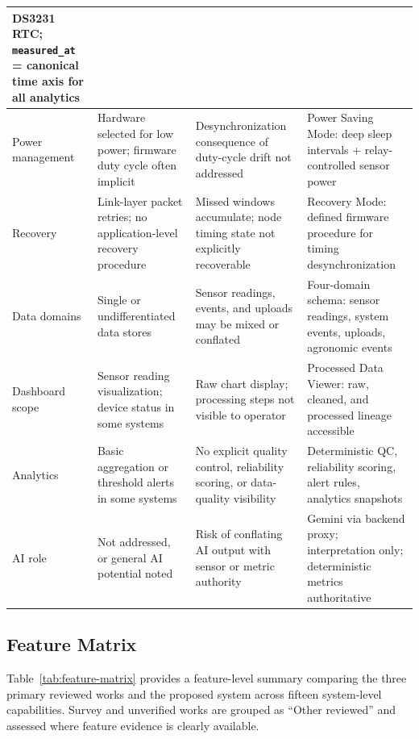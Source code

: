 \begin{table}[H]
\begin{tabular}{|p{2.5cm}|p{3.0cm}|p{3.3cm}|p{3.3cm}|}
    DS3231 RTC; \texttt{measured\_at} = canonical time axis for all analytics \\
    \hline
    Power management &
    Hardware selected for low power; firmware duty cycle often implicit &
    Desynchronization consequence of duty-cycle drift not addressed &
    Power Saving Mode: deep sleep intervals + relay-controlled sensor power \\
    \hline
    Recovery &
    Link-layer packet retries; no application-level recovery procedure &
    Missed windows accumulate; node timing state not explicitly recoverable &
    Recovery Mode: defined firmware procedure for timing desynchronization \\
    \hline
    Data domains &
    Single or undifferentiated data stores &
    Sensor readings, events, and uploads may be mixed or conflated &
    Four-domain schema: sensor readings, system events, uploads, agronomic events \\
    \hline
    Dashboard scope &
    Sensor reading visualization; device status in some systems &
    Raw chart display; processing steps not visible to operator &
    Processed Data Viewer: raw, cleaned, and processed lineage accessible \\
    \hline
    Analytics &
    Basic aggregation or threshold alerts in some systems &
    No explicit quality control, reliability scoring, or data-quality visibility &
    Deterministic QC, reliability scoring, alert rules, analytics snapshots \\
    \hline
    AI role &
    Not addressed, or general AI potential noted &
    Risk of conflating AI output with sensor or metric authority &
    Gemini via backend proxy; interpretation only; deterministic metrics authoritative \\
    \hline
  \end{tabular}
\end{table}

\subsection*{Feature Matrix}

Table~\ref{tab:feature-matrix} provides a feature-level summary comparing the
three primary reviewed works and the proposed system across fifteen
system-level capabilities. Survey and unverified works are grouped as
``Other reviewed'' and assessed where feature evidence is clearly available.

